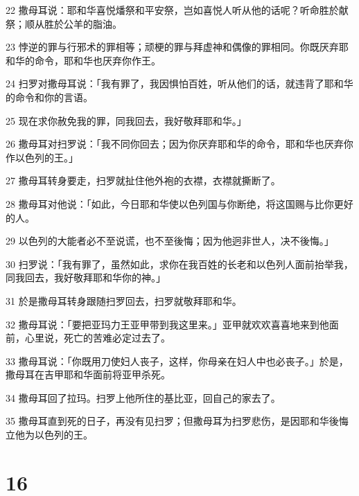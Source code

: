 \par 22 撒母耳说：耶和华喜悦燔祭和平安祭，岂如喜悦人听从他的话呢？听命胜於献祭；顺从胜於公羊的脂油。
\par 23 悖逆的罪与行邪术的罪相等；顽梗的罪与拜虚神和偶像的罪相同。你既厌弃耶和华的命令，耶和华也厌弃你作王。
\par 24 扫罗对撒母耳说：「我有罪了，我因惧怕百姓，听从他们的话，就违背了耶和华的命令和你的言语。
\par 25 现在求你赦免我的罪，同我回去，我好敬拜耶和华。」
\par 26 撒母耳对扫罗说：「我不同你回去；因为你厌弃耶和华的命令，耶和华也厌弃你作以色列的王。」
\par 27 撒母耳转身要走，扫罗就扯住他外袍的衣襟，衣襟就撕断了。
\par 28 撒母耳对他说：「如此，今日耶和华使以色列国与你断绝，将这国赐与比你更好的人。
\par 29 以色列的大能者必不至说谎，也不至後悔；因为他迥非世人，决不後悔。」
\par 30 扫罗说：「我有罪了，虽然如此，求你在我百姓的长老和以色列人面前抬举我，同我回去，我好敬拜耶和华你的神。」
\par 31 於是撒母耳转身跟随扫罗回去，扫罗就敬拜耶和华。
\par 32 撒母耳说：「要把亚玛力王亚甲带到我这里来。」亚甲就欢欢喜喜地来到他面前，心里说，死亡的苦难必定过去了。
\par 33 撒母耳说：「你既用刀使妇人丧子，这样，你母亲在妇人中也必丧子。」於是，撒母耳在吉甲耶和华面前将亚甲杀死。
\par 34 撒母耳回了拉玛。扫罗上他所住的基比亚，回自己的家去了。
\par 35 撒母耳直到死的日子，再没有见扫罗；但撒母耳为扫罗悲伤，是因耶和华後悔立他为以色列的王。

\chapter{16}

